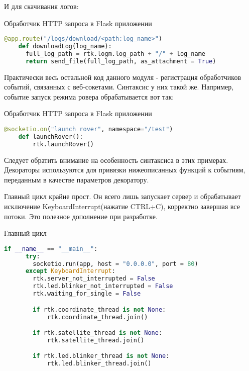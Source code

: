 И для скачивания логов:

\begin{ListingEnv}[H]
  \caption{Обработчик HTTP запроса в Flask приложении}
  \label{list:hwbeauty}
  \begin{lstlisting}[language=Python]
    @app.route("/logs/download/<path:log_name>")
    def downloadLog(log_name):
      full_log_path = rtk.logm.log_path + "/" + log_name
      return send_file(full_log_path, as_attachment = True)
  \end{lstlisting}
\end{ListingEnv}

Практически весь остальной код данного модуля - регистрация обработчиков событий, связанных с веб-сокетами. Синтаксис у них такой же. Например, событие запуск режима ровера обрабатывается вот так:

\begin{ListingEnv}[H]
  \caption{Обработчик HTTP запроса в Flask приложении}
  \label{list:hwbeauty}
  \begin{lstlisting}[language=Python]
    @socketio.on("launch rover", namespace="/test")
    def launchRover():
        rtk.launchRover()
  \end{lstlisting}
\end{ListingEnv}

Следует обратить внимание на особенность синтаксиса в этих примерах. Декораторы используются для привязки нижеописанных функций к событиям, переданным в качестве параметров декоратору.

Главный цикл крайне прост. Он всего лишь запускает сервер и обрабатывает исключение KeyboardInterrupt(нажатие CTRL+C), корректно завершая все потоки. Это полезное дополнение при разработке.

\begin{ListingEnv}[H]
  \caption{Главный цикл}
  \label{list:hwbeauty}
  \begin{lstlisting}[language=Python]
    if __name__ == "__main__":
      try:
        socketio.run(app, host = "0.0.0.0", port = 80)
      except KeyboardInterrupt:
        rtk.server_not_interrupted = False
        rtk.led.blinker_not_interrupted = False
        rtk.waiting_for_single = False

        if rtk.coordinate_thread is not None:
            rtk.coordinate_thread.join()

        if rtk.satellite_thread is not None:
            rtk.satellite_thread.join()

        if rtk.led.blinker_thread is not None:
            rtk.led.blinker_thread.join()

  \end{lstlisting}
\end{ListingEnv}

